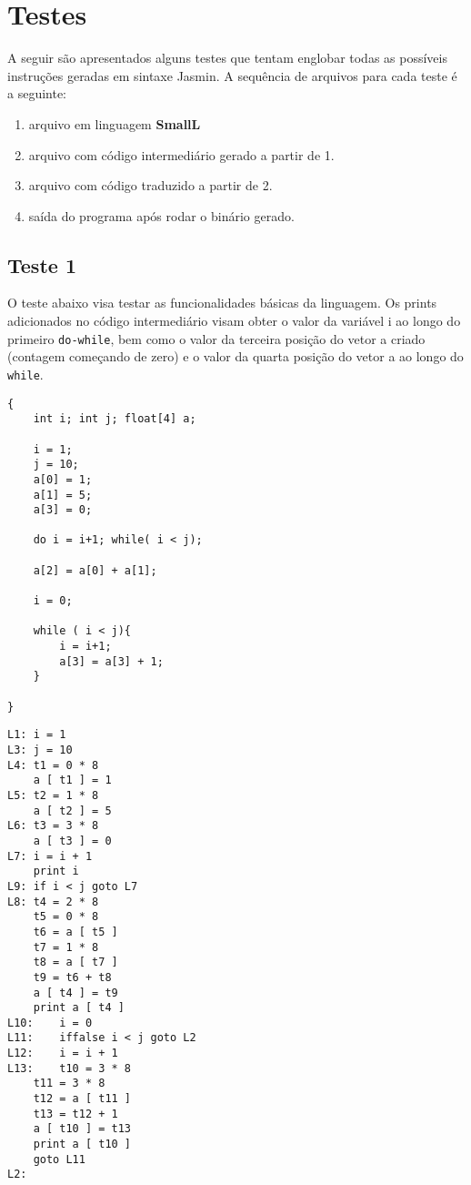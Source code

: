 \section{Testes}

A seguir são apresentados alguns testes que tentam englobar todas as possíveis instruções geradas em sintaxe Jasmin. A sequência de arquivos para cada teste é a seguinte:

\begin{enumerate}
\item arquivo em linguagem \textbf{SmallL}
\item arquivo com código intermediário gerado a partir de 1.
\item arquivo com código traduzido a partir de 2.
\item saída do programa após rodar o binário gerado.
\end{enumerate}

\subsection{Teste 1}

O teste abaixo visa testar as funcionalidades básicas da linguagem. Os prints adicionados no código intermediário visam obter o valor da variável i ao longo do primeiro \texttt{do-while}, bem como o valor da terceira posição do vetor a criado (contagem começando de zero) e o valor da quarta posição do vetor a ao longo do \texttt{while}.

\begin{lstlisting}[caption=\textbf{Arquivo do teste 1 em linguagem SmallL}]
{
	int i; int j; float[4] a;
	
	i = 1;
	j = 10;
	a[0] = 1;
	a[1] = 5;
	a[3] = 0;

	do i = i+1; while( i < j);

	a[2] = a[0] + a[1];
	
	i = 0;

	while ( i < j){
		i = i+1;
		a[3] = a[3] + 1;
	}

}
\end{lstlisting}

\begin{lstlisting}[caption=\textbf{Arquivo com código intermediário para o teste 1 produzido pelo front-end (adicionado de comandos print "na mão")}]
L1:	i = 1
L3:	j = 10
L4:	t1 = 0 * 8
    a [ t1 ] = 1
L5:	t2 = 1 * 8
    a [ t2 ] = 5
L6:	t3 = 3 * 8
    a [ t3 ] = 0
L7:	i = i + 1
    print i
L9:	if i < j goto L7
L8:	t4 = 2 * 8
    t5 = 0 * 8
    t6 = a [ t5 ]
    t7 = 1 * 8
    t8 = a [ t7 ]
    t9 = t6 + t8
    a [ t4 ] = t9
    print a [ t4 ]
L10:	i = 0
L11:	iffalse i < j goto L2
L12:	i = i + 1
L13:	t10 = 3 * 8
    t11 = 3 * 8
    t12 = a [ t11 ]
    t13 = t12 + 1
    a [ t10 ] = t13
    print a [ t10 ]
    goto L11
L2:

\end{lstlisting}


